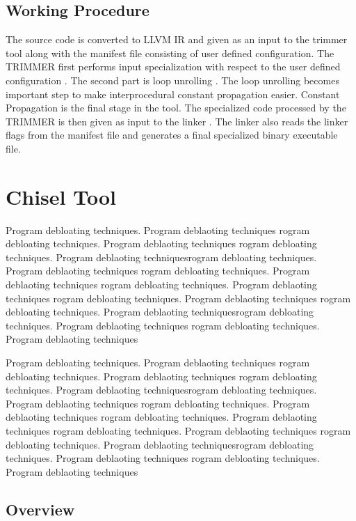 \documentclass{relatorio}
\begin{document}
\subsection{Working Procedure}%
\label{Tools}

The source code is converted to LLVM IR  and given as an input to the trimmer tool along with the manifest file consisting of user defined configuration. The TRIMMER first performs input specialization with respect to the user defined configuration . The second part is loop unrolling . The loop unrolling becomes important step to make interprocedural constant propagation easier. Constant Propagation is the final stage in the tool. The specialized code processed by the TRIMMER is then given as input to the linker . The linker also reads the linker flags from the manifest file and generates a final specialized binary executable file.

\section{Chisel Tool}%
\label{Tools}

Program debloating techniques. Program deblaoting techniques rogram debloating techniques. Program deblaoting techniques
rogram debloating techniques. Program deblaoting techniquesrogram debloating techniques. Program deblaoting techniques
rogram debloating techniques. Program deblaoting techniques rogram debloating techniques. Program deblaoting techniques
rogram debloating techniques. Program deblaoting techniques 
rogram debloating techniques. Program deblaoting techniquesrogram debloating techniques. Program deblaoting techniques
rogram debloating techniques. Program deblaoting techniques

Program debloating techniques. Program deblaoting techniques rogram debloating techniques. Program deblaoting techniques
rogram debloating techniques. Program deblaoting techniquesrogram debloating techniques. Program deblaoting techniques
rogram debloating techniques. Program deblaoting techniques rogram debloating techniques. Program deblaoting techniques
rogram debloating techniques. Program deblaoting techniques 
rogram debloating techniques. Program deblaoting techniquesrogram debloating techniques. Program deblaoting techniques
rogram debloating techniques. Program deblaoting techniques	

\subsection{Overview}%
\label{Tools}
\end{document}
